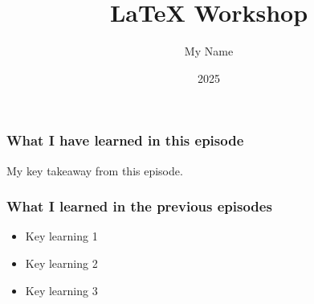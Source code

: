 \documentclass{beamer}
\title{LaTeX Workshop}
\author{My Name}
\institute{ABCD Project Group}
\date{2025}
\begin{document}
	
\frame{\titlepage}

\begin{frame}
	\frametitle{What I have learned in this episode}
	My key takeaway from this episode.
\end{frame}

\begin{frame}
	\frametitle{What I learned in the previous episodes}
	\begin{itemize}
		\item Key learning 1
		\item Key learning 2
		\item Key learning 3
	\end{itemize}
\end{frame}
	
\end{document}
